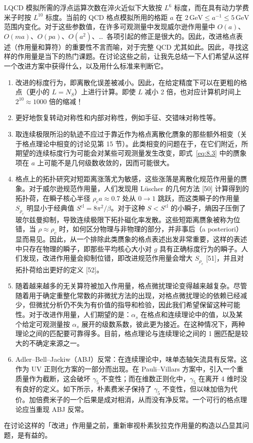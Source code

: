LQCD 模拟所需的浮点运算次数在淬火近似下大致按 $L^6$ 标度，而在具有动力学费米子时按 $L^{10}$ 标度。当前的 QCD 格点模拟所用的格距 $a$ 在 $2\,\mathrm{GeV} \leq a^{-1} \leq 5\,\mathrm{GeV}$ 范围内变化。对于这些参数值，在许多可观测量中发现威尔逊作用量中 $O(a)$、$O(ma)$、$O(pa)$、$O(a^2)$、\ldots\ 各项引起的修正是很大的。因此，改进格点表述（作用量和算符）的重要性不言而喻，对于完整 QCD 尤其如此。因此，寻找这样的作用量是当下的热门课题。在讨论这些之前，让我先总结一下人们希望从这样一个改进方案中获得什么，以及用什么标准来判断它。
\begin{enumerate}
\item 改进的标度行为，即离散化误差被减小。因此，在给定精度下可以在更粗的格点（更小的 $L = N_S$）上进行计算。即使 $L$ 减小 2 倍，也对应计算机时间上 $2^{10} \approx 1000$ 倍的缩减！

\item 更好地恢复转动对称性和内部对称性，例如手征、交错味对称性等。

\item 取连续极限所沿的轨迹不应过于靠近作为格点离散化赝象的那些额外相变（关于格点理论中相变的讨论见第 15 节）。此类相变的问题在于，在它们附近，所期望的连续标度行为可能会对某些可观测量发生改变，即式~\ref{eq:8.3} 中的赝象项在 $a$ 上可能不是几何级数收敛的，因而可能很大。

\item 格点上的拓扑研究对短距离涨落尤为敏感，这些涨落是离散化规范作用量的赝象。对于威尔逊规范作用量，人们发现用 Lüscher 的几何方法 [50] 计算得到的拓扑荷，在瞬子核心半径 $\rho_c a \approx 0.7$ 处从 $0 \to 1$ 跳跃，而这类瞬子的作用量 $S_{\rho_c}$ 明显小于经典值 $S^{\mathrm{cl}} = 8\pi^2/\beta$。对于这种 $S < S^{\mathrm{cl}}$ 的小瞬子，熵因子压倒了玻尔兹曼抑制，导致连续极限下拓扑磁化率发散。这些短距离赝象被称为位错，当 $\rho \approx \rho_c$ 时，如何区分物理与非物理的部分，并非事后（a posteriori）显而易见。因此，从一个排除此类赝象的格点表述出发非常重要，这样的表述中只存在物理的瞬子，即那些平均核心大小对 $g$ 具有正确标度行为的瞬子。人们发现，改进作用量会抑制位错，即改进规范作用量会增大 $S_{\rho_c}$ [51]，并且对拓扑荷给出更好的定义 [52]。

\item 随着越来越多的无关算符被加入作用量，格点微扰理论变得越来越复杂。尽管随着用于确定重整化常数的非微扰方法的出现，对格点微扰理论的依赖已经减少，但微扰分析仍不失为有价值的指导和检验，因此我们希望保留这种可能性。对于改进作用量，人们期望的是：$\alpha_s$ 在格点和连续理论中的值，以及某个给定可观测量按 $\alpha_s$ 展开的级数系数，彼此更为接近。在这种情况下，两种理论之间的匹配要可靠得多。目前，格点理论与连续理论之间的 1 圈匹配是较大的不确定来源之一。

\item Adler–Bell–Jackiw（ABJ）反常：在连续理论中，味单态轴矢流具有反常。这作为 UV 正则化方案的一部分而出现。在 Pauli–Villars 方案中，引入一个重质量作为截断，这会破坏 $\gamma_5$ 不变性；而在维数正则化中，$\gamma_5$ 在离开 4 维时没有良好的定义。如下所示，朴素费米子保持了 $\gamma_5$ 不变性，但以味加倍为代价。加倍费米子的一个后果是成对相消，从而没有净反常。一个可行的格点理论应当重现 ABJ 反常。
\end{enumerate}

在讨论这样的「改进」作用量之前，重新审视朴素狄拉克作用量的构造以凸显其问题，是有益的。
